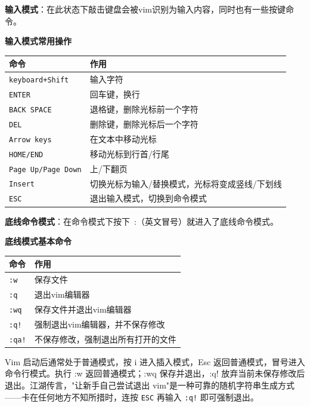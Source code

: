 \textbf{输入模式}：在此状态下敲击键盘会被vim识别为输入内容，同时也有一些按键命令。


\begin{table}[H]\centering
\textbf{输入模式常用操作}

	\begin{tabular}{p{}p{}}
		\toprule[1.5pt]
		命令 & 作用\\
		\midrule[1pt]
		\texttt{keyboard+Shift}		&输入字符\\
		\texttt{ENTER}		&回车键，换行\\
		\texttt{BACK SPACE}		&退格键，删除光标前一个字符\\
		\texttt{DEL}		&删除键，删除光标后一个字符\\
		\texttt{Arrow keys}		&在文本中移动光标\\
		\texttt{HOME/END}		&移动光标到行首/行尾\\
		\texttt{Page Up/Page Down}		&上/下翻页\\
		\texttt{Insert}		&切换光标为输入/替换模式，光标将变成竖线/下划线\\
		\texttt{ESC}		&退出输入模式，切换到命令模式\\
		\bottomrule[1.5pt]
	\end{tabular}
\end{table}


\textbf{底线命令模式}：在命令模式下按下 :（英文冒号）就进入了底线命令模式。


\begin{table}[H]\centering
\textbf{底线模式基本命令}

	\begin{tabular}{p{}p{}}
		\toprule[1.5pt]
		命令 & 作用\\
		\midrule[1pt]
		\texttt{:w}		&保存文件\\
		\texttt{:q}		&退出vim编辑器\\
		\texttt{:wq}		&保存文件并退出vim编辑器\\
		\texttt{:q!}		&强制退出vim编辑器，并不保存修改\\
		\texttt{:qa!}		&不保存修改，强制退出所有打开的文件\\
		\bottomrule[1.5pt]
	\end{tabular}
\end{table}


\begin{conclusion}
Vim 启动后通常处于普通模式，按 i 进入插入模式，Esc 返回普通模式，冒号进入命令行模式。执行 :w 返回普通模式；:wq 保存并退出，:q! 放弃当前未保存修改后退出。江湖传言，"让新手自己尝试退出 vim"是一种可靠的随机字符串生成方式——卡在任何地方不知所措时，连按 \texttt{ESC} 再输入 \texttt{:q!} 即可强制退出。
\end{conclusion}

